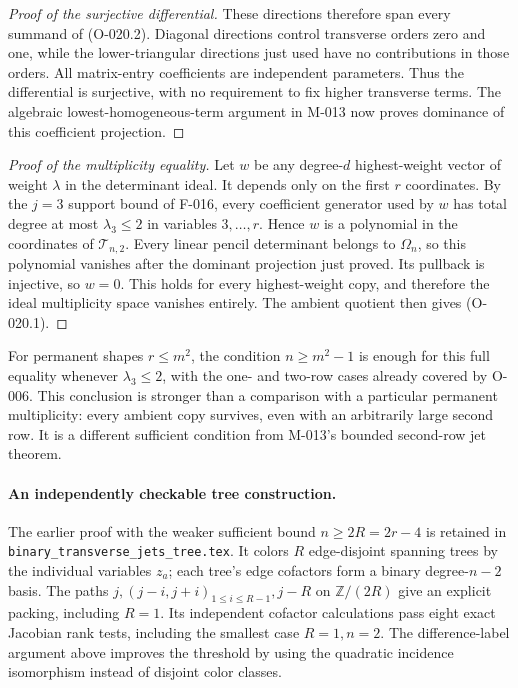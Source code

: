 \begin{proof}[Proof of the surjective differential]
These directions therefore span every summand of
(O-020.2). Diagonal directions control transverse orders
zero and one, while the lower-triangular directions just
used have no contributions in those orders. All matrix-entry coefficients are
independent parameters. Thus the differential is surjective,
with no requirement to fix higher transverse terms.
The algebraic lowest-homogeneous-term argument in M-013
now proves dominance of this coefficient projection.
\end{proof}

\begin{proof}[Proof of the multiplicity equality]
Let $w$ be any degree-$d$ highest-weight vector of weight
$\lambda$ in the determinant ideal. It depends only on
the first $r$ coordinates. By the $j=3$ support bound
of F-016, every coefficient generator used by $w$ has
total degree at most $\lambda_3\leq2$ in variables
$3,\ldots,r$. Hence $w$ is a polynomial in the
coordinates of $\mathcal T_{n,2}$.
Every linear pencil determinant belongs to $\Omega_n$,
so this polynomial vanishes after the dominant projection
just proved. Its pullback is injective, so $w=0$.
This holds for every highest-weight copy, and therefore
the ideal multiplicity space vanishes entirely. The
ambient quotient then gives (O-020.1).
\end{proof}

For permanent shapes $r\leq m^2$, the condition
$n\geq m^2-1$ is enough for this full equality whenever
$\lambda_3\leq2$, with the one- and two-row cases already
covered by O-006. This conclusion is stronger than a
comparison with a particular permanent multiplicity: every
ambient copy survives, even with an arbitrarily large second
row. It is a different sufficient condition from M-013's
bounded second-row jet theorem.

\paragraph{An independently checkable tree construction.}
The earlier proof with the weaker sufficient bound
$n\geq2R=2r-4$ is retained in
\texttt{binary\_transverse\_jets\_tree.tex}.
It colors $R$ edge-disjoint spanning trees by the individual
variables $z_a$; each tree's edge cofactors form a binary
degree-$n-2$ basis. The paths
$j,(j-i,j+i)_{1\leq i\leq R-1},j-R$ on $\mathbb Z/(2R)$
give an explicit packing, including $R=1$.
Its independent cofactor calculations pass eight exact
Jacobian rank tests, including the smallest case $R=1,n=2$.
The difference-label argument above improves the threshold
by using the quadratic incidence isomorphism instead of
disjoint color classes.

